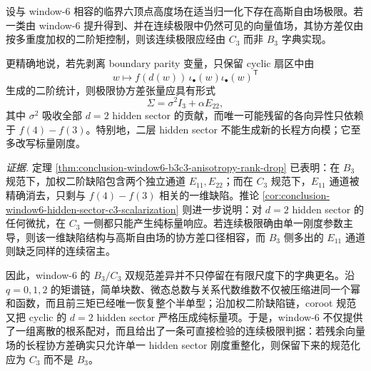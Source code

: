 \begin{conjecture}\label{conj:conclusion-window6-gff-coroot-selection-principle}
设与 window-\(6\) 相容的临界六顶点高度场在适当归一化下存在高斯自由场极限。若一类由 window-\(6\) 提升得到、并在连续极限中仍然可见的向量值场，其协方差仅由按多重度加权的二阶矩控制，则该连续极限应经由 \(C_3\) 而非 \(B_3\) 字典实现。

更精确地说，若先剥离 boundary parity 变量，只保留 cyclic 扇区中由
\[
w\longmapsto f(d(w))\,\iota_\bullet(w)\iota_\bullet(w)^{\mathsf T}
\]
生成的二阶统计，则极限协方差张量应具有形式
\[
\Sigma=\sigma^2 I_3+\alpha E_{22},
\]
其中 \(\sigma^2\) 吸收全部 \(d=2\) hidden sector 的贡献，而唯一可能残留的各向异性只依赖于 \(f(4)-f(3)\)。特别地，二层 hidden sector 不能生成新的长程方向模；它至多改写标量刚度。

\noindent\emph{证据.}
定理 \ref{thm:conclusion-window6-b3c3-anisotropy-rank-drop} 已表明：在 \(B_3\) 规范下，加权二阶缺陷包含两个独立通道 \(E_{11},E_{22}\)；而在 \(C_3\) 规范下，\(E_{11}\) 通道被精确消去，只剩与 \(f(4)-f(3)\) 相关的一维缺陷。推论 \ref{cor:conclusion-window6-hidden-sector-c3-scalarization} 则进一步说明：对 \(d=2\) hidden sector 的任何微扰，在 \(C_3\) 一侧都只能产生纯标量响应。若连续极限确由单一刚度参数主导，则该一维缺陷结构与高斯自由场的协方差口径相容，而 \(B_3\) 侧多出的 \(E_{11}\) 通道则缺乏同样的连续宿主。
\end{conjecture}



\noindent
因此，window-\(6\) 的 \(B_3/C_3\) 双规范差异并不只停留在有限尺度下的字典更名。沿 \(q=0,1,2\) 的矩谱链，简单块数、微态总数与关系代数维数不仅被压缩进同一个幂和函数，而且前三矩已经唯一恢复整个半单型；沿加权二阶缺陷链，coroot 规范又把 cyclic 的 \(d=2\) hidden sector 严格压成纯标量项。于是，window-\(6\) 不仅提供了一组离散的根系配对，而且给出了一条可直接检验的连续极限判据：若残余向量场的长程协方差确实只允许单一 hidden sector 刚度重整化，则保留下来的规范化应为 \(C_3\) 而不是 \(B_3\)。

\endinput
